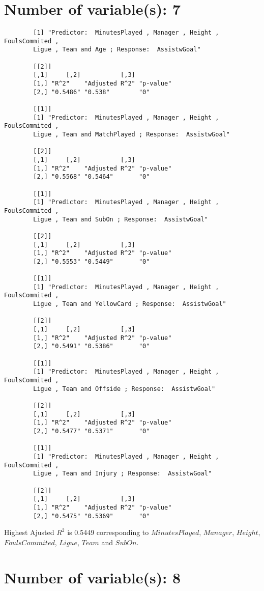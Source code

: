 \documentclass[12pt]{article}
\begin{document}
	\section{Number of variable(s): 7}
	\begin{verbatim}
		[1] "Predictor:  MinutesPlayed , Manager , Height , FoulsCommited , 
		Ligue , Team and Age ; Response:  AssistwGoal"
		
		[[2]]
		[,1]     [,2]           [,3]     
		[1,] "R^2"    "Adjusted R^2" "p-value"
		[2,] "0.5486" "0.538"        "0"      
		
		[[1]]
		[1] "Predictor:  MinutesPlayed , Manager , Height , FoulsCommited , 
		Ligue , Team and MatchPlayed ; Response:  AssistwGoal"
		
		[[2]]
		[,1]     [,2]           [,3]     
		[1,] "R^2"    "Adjusted R^2" "p-value"
		[2,] "0.5568" "0.5464"       "0"      
		
		[[1]]
		[1] "Predictor:  MinutesPlayed , Manager , Height , FoulsCommited , 
		Ligue , Team and SubOn ; Response:  AssistwGoal"
		
		[[2]]
		[,1]     [,2]           [,3]     
		[1,] "R^2"    "Adjusted R^2" "p-value"
		[2,] "0.5553" "0.5449"       "0"      
		
		[[1]]
		[1] "Predictor:  MinutesPlayed , Manager , Height , FoulsCommited , 
		Ligue , Team and YellowCard ; Response:  AssistwGoal"
		
		[[2]]
		[,1]     [,2]           [,3]     
		[1,] "R^2"    "Adjusted R^2" "p-value"
		[2,] "0.5491" "0.5386"       "0"      
		
		[[1]]
		[1] "Predictor:  MinutesPlayed , Manager , Height , FoulsCommited , 
		Ligue , Team and Offside ; Response:  AssistwGoal"
		
		[[2]]
		[,1]     [,2]           [,3]     
		[1,] "R^2"    "Adjusted R^2" "p-value"
		[2,] "0.5477" "0.5371"       "0"      
		
		[[1]]
		[1] "Predictor:  MinutesPlayed , Manager , Height , FoulsCommited , 
		Ligue , Team and Injury ; Response:  AssistwGoal"
		
		[[2]]
		[,1]     [,2]           [,3]     
		[1,] "R^2"    "Adjusted R^2" "p-value"
		[2,] "0.5475" "0.5369"       "0"    
	\end{verbatim}
	
	Highest Ajusted $ R^2 $ is 0.5449 corresponding to $ MinutesPlayed $, $ Manager $, $ Height $, $ FoulsCommited $, $ Ligue $, $ Team $ and $ SubOn $.
	
	\section{Number of variable(s): 8}
	
\end{document}
